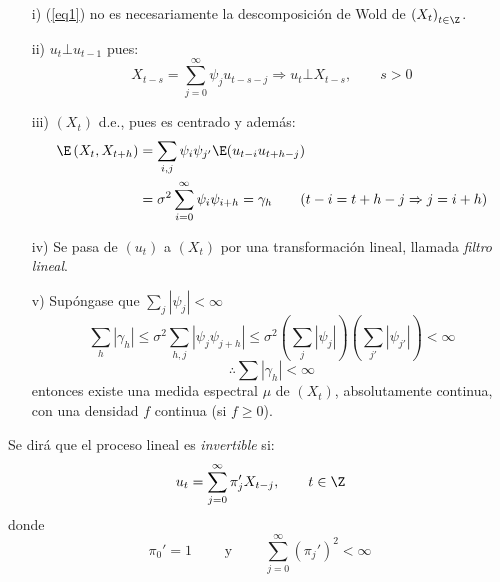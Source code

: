 \begin{observacion}
\quad
\begin{enumerate}
\item[i)] (\ref{eq1}) no es necesariamente la descomposici\'{o}n de Wold de $\left( {X_{t} } \right)_{t\in \Z} $.
\item[ii)] $u_{t}\bot u_{t-1}$ pues:
\[
X_{t-s} =\sum_{j=0}^\infty {\psi_{j} u_{t-s-j} \Longrightarrow u_{t} 
\bot X_{t-s} ,} 
\qquad
s>0
\]

\item[iii)] $(X_{t} )$ d.e., pues es centrado y adem\'{a}s:
\begin{align*}
 \E\left( {X_{t} ,X_{t+h} } \right)
	 &=\sum_{i,j} {\psi_{i} \psi_{j'} \E(u_{t-i} u_{t+h-j} )} \\
	 &=\sigma^{2}\sum_{i=0}^\infty {\psi_{i} \psi_{i+h} =\gamma_{h} } 
\qquad
(t-i=t+h-j\Rightarrow j=i+h)
\end{align*}

\item[iv)] Se pasa de $\left( {u_{t} } \right)$ a $\left( {X_{t} } \right)$ por una transformaci\'{o}n lineal, llamada \emph{filtro lineal}.
\item[v)] Sup\'{o}ngase que $\sum_j {\left| {\psi_{j} } \right|<\infty } $
\[
\sum_h {\left| {\gamma_{h} } \right|\le \sigma^{2}\sum_{h,j} 
{\left| {\psi_{j} \psi_{j+h} } \right|} } \le \sigma^{2}\left( 
{\sum_j {\left| {\psi_{j} } \right|} } \right)\left( 
{\sum_{j'} {\left| {\psi_{j'} } \right|} } \right)<\infty 
\]
\[
\therefore\sum {\left| {\gamma_{h} } \right|<\infty } 
\]
entonces existe una medida espectral $\mu$ de $\left(X_{t}\right)$, absolutamente continua, con una densidad $f$ continua (si $f\geq 0$).
\end{enumerate}

\end{observacion}

\begin{definicion}
Se dir\'{a} que el proceso lineal es \emph{invertible} si:
\[
u_{t} =\sum_{j=0}^\infty {\pi_{j}' X_{t-j}, \qquad t\in \Z} 
\]
donde 
\[
\pi_{0}' =1 \qquad\text{ y }\qquad  \sum_{j=0}^\infty \left( \pi_{j}' \right)^{2} <\infty 
\]
\end{definicion}

